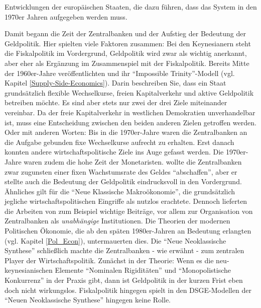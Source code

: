 Entwicklungen der europäischen Staaten, die dazu führen, dass das System in den 1970er Jahren aufgegeben werden muss.

Damit begann die Zeit der Zentralbanken und der Aufstieg der Bedeutung der Geldpolitik. Hier spielten viele Faktoren zusammen: Bei den Keynesianern steht die Fiskalpolitik im Vordergrund, Geldpolitik wird zwar als wichtig anerkannt, aber eher als Ergänzung im Zusammenspiel mit der Fiskalpolitik. Bereits Mitte der 1960er-Jahre veröffentlichten \textcite{Mundell1963} und \textcite{Fleming1962} ihr "`Impossible Trinity"'-Modell (vgl. Kapitel \ref{Supply-Side-Economics}). Darin beschreiben Sie, dass ein Staat grundsätzlich flexible Wechselkurse, freien Kapitalverkehr und aktive Geldpolitik betreiben möchte. Es sind aber stets nur zwei der drei Ziele miteinander vereinbar. Da der freie Kapitalverkehr in westlichen Demokratien unverhandelbar ist, muss eine Entscheidung zwischen den beiden anderen Zielen getroffen werden. Oder mit anderen Worten: Bis in die 1970er-Jahre waren die Zentralbanken an die Aufgabe gebunden fixe Wechselkurse aufrecht zu erhalten. Erst danach konnten andere wirtschaftspolitische Ziele ins Auge gefasst werden. Die 1970er-Jahre waren zudem die hohe Zeit der Monetaristen. \textcite{Friedman1968, Friedman1976b} wollte die Zentralbanken zwar zugunsten einer fixen Wachstumsrate des Geldes "`abschaffen"', aber er stellte auch die Bedeutung der Geldpolitik eindrucksvoll in den Vordergrund. Ähnliches gilt für die "`Neue Klassische Makroökonomie"', die grundsätzlich jegliche wirtschaftspolitischen Eingriffe als nutzlos erachtete. Dennoch lieferten die Arbeiten von zum Beispiel \textcite{Kydland1977, Barro1976} wichtige Beiträge, vor allem zur Organisation von Zentralbanken als \textit{unabhängige} Institutionen. Die Theorien der modernen Politischen Ökonomie, die ab den späten 1980er-Jahren an Bedeutung erlangten (vgl. Kapitel \ref{Pol_Econ}), untermauerten dies. Die "`Neue Neoklassische Synthese"' schließlich machte die Zentralbanken - wie erwähnt - zum zentralen Player der Wirtschaftspolitik. Zunächst in der Theorie: Wenn es die neu-keynesianischen Elemente "`Nominalen Rigiditäten"' und "`Monopolistische Konkurrenz"' in der Praxis gibt, dann ist Geldpolitik in der kurzen Frist eben doch nicht wirkungslos. Fiskalpolitik hingegen spielt in den DSGE-Modellen der "`Neuen Neoklassische Synthese"' hingegen keine Rolle.

